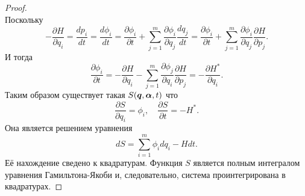 \begin{proof}
\[    \]
    Поскольку
    \[
        -\dfrac{\partial H}{\partial q_i} = \dfrac{d p_i}{dt} = \dfrac{d\phi_i}{dt} = \dfrac{\partial \phi_i}{\partial t} + \sum\limits_{j = 1}^m \dfrac{\partial \phi_i}{\partial q_j}\dfrac{dq_j}{dt} = \dfrac{\partial \phi_i}{\partial t} + \sum\limits_{j = 1}^m \dfrac{\partial \phi_i}{\partial q_j} \dfrac{\partial H}{\partial p_j}.
    \]
    И тогда
    \[
        \dfrac{\partial \phi_i}{\partial t} = -\dfrac{\partial H}{\partial q_i} - \sum\limits_{j = 1}^m \dfrac{\partial \phi_j}{\partial q_i} \dfrac{\partial H}{\partial p_j} = - \dfrac{\partial H^*}{\partial q_i}.
    \]
    Таким образом существует такая $S(\boldsymbol{q}, \boldsymbol{\alpha}, t)$ что
    \[
        \dfrac{\partial S}{\partial q_i} = \phi_i, \quad \dfrac{\partial S}{\partial t} = -H^*.
    \]
    Она является решением уравнения
    \[
        dS = \sum\limits_{i = 1}^m \phi_i dq_i - Hdt.
    \]
    Её нахождение сведено к квадратурам.
    Функция $S$ является полным интегралом уравнения Гамильтона-Якоби и, следовательно, система проинтегрирована в квадратурах.
\end{proof}